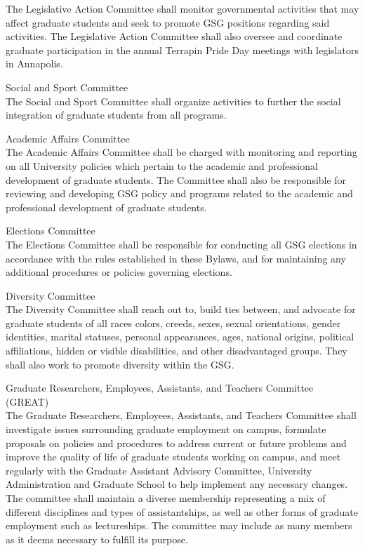 \begin{bylaws-number}
\begin{bylaws-number}
The Legislative Action Committee shall monitor governmental activities that may affect graduate students and seek to promote GSG positions regarding said activities. The Legislative Action Committee shall also oversee and coordinate graduate participation in the annual Terrapin Pride Day meetings with legislators in Annapolis.
    \item Social and Sport Committee \hfill \\
The Social and Sport Committee shall organize activities to further the social integration of graduate students from all programs.
    \item Academic Affairs Committee \hfill \\
The Academic Affairs Committee shall be charged with monitoring and reporting on all University policies which pertain to the academic and professional development of graduate students. The Committee shall also be responsible for reviewing and developing GSG policy and programs related to the academic and professional development of graduate students.
    \item Elections Committee \hfill \\
The Elections Committee shall be responsible for conducting all GSG elections in accordance with the rules established in these Bylaws, and for maintaining any additional procedures or policies governing elections.
    \item Diversity Committee \hfill \\
The Diversity Committee shall reach out to, build ties between, and advocate for graduate students of all races colors, creeds, sexes, sexual orientations, gender identities, marital statuses, personal appearances, ages, national origins, political affiliations, hidden or visible disabilities, and other disadvantaged groups. They shall also work to promote diversity within the GSG.
    \item Graduate Researchers, Employees, Assistants, and Teachers Committee (GREAT) \hfill \\
The Graduate Researchers, Employees, Assistants, and Teachers Committee shall investigate issues surrounding graduate employment on campus, formulate proposals on policies and procedures to address current or future problems and improve the quality of life of graduate students working on campus, and meet regularly with the Graduate Assistant Advisory Committee, University Administration and Graduate School to help implement any necessary changes. The committee shall maintain a diverse membership representing a mix of different disciplines and types of assistantships, as well as other forms of graduate employment such as lectureships. The committee may include as many members as it deems necessary to fulfill its purpose.

\end{bylaws-number}
\end{bylaws-number}
